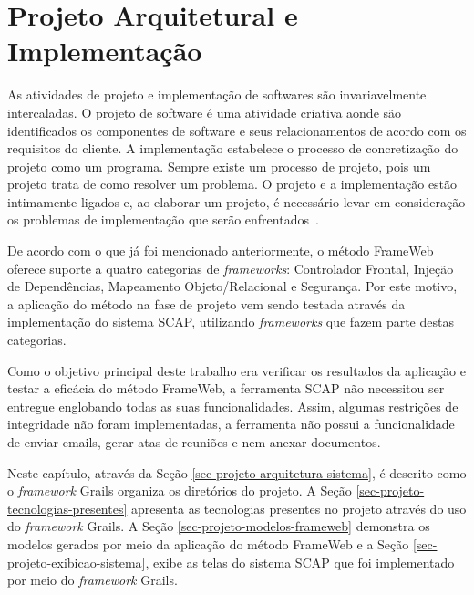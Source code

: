 \chapter{Projeto Arquitetural e Implementação}
\label{sec-projeto}

As atividades de projeto e implementação de softwares são invariavelmente intercaladas. O projeto de software é uma atividade criativa aonde são identificados os componentes de software e seus relacionamentos de acordo com os requisitos do cliente. A implementação estabelece o processo de concretização do projeto como um programa. Sempre existe um processo de projeto, pois um projeto trata de como resolver um problema. O projeto e a implementação estão intimamente ligados e, ao elaborar um projeto, é necessário levar em consideração os problemas de implementação que serão enfrentados~\cite{sommerville:es11}.

De acordo com o que já foi mencionado anteriormente, o método FrameWeb oferece suporte a quatro categorias de \textit{frameworks}: Controlador Frontal, Injeção de Dependências, Mapeamento Objeto/Relacional e Segurança. Por este motivo, a aplicação do método na fase de projeto vem sendo testada através da implementação do sistema SCAP, utilizando \textit{frameworks} que fazem parte destas categorias.

Como o objetivo principal deste trabalho era verificar os resultados da aplicação e testar a eficácia do método FrameWeb, a ferramenta SCAP não necessitou ser entregue englobando todas as suas funcionalidades. Assim, algumas restrições de integridade não foram implementadas, a ferramenta não possui a funcionalidade de enviar emails, gerar atas de reuniões e nem anexar documentos.

Neste capítulo, através da Seção \ref{sec-projeto-arquitetura-sistema}, é descrito como o \textit{framework} Grails organiza os diretórios do projeto. A Seção \ref{sec-projeto-tecnologias-presentes} apresenta as tecnologias presentes no projeto através do uso do \textit{framework} Grails. A Seção \ref{sec-projeto-modelos-frameweb} demonstra os modelos gerados por meio da aplicação do método FrameWeb e a Seção \ref{sec-projeto-exibicao-sistema}, exibe as telas do sistema SCAP que foi implementado por meio do \textit{framework} Grails.           

